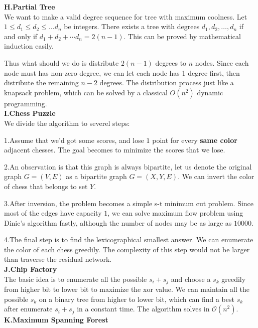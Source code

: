 \documentclass[14pt,a4paper]{article}
\begin{document}
{\Large \bf H.Partial Tree}\\

We want to make a valid degree sequence for tree with maximum coolness.
Let $1 \le d_1 \le d_2 \le \ldots d_n$ be integers.
There exists a tree with degrees $d_1, d_2, \ldots, d_n$ if and only if
$d_1 + d_2 + \cdots d_n = 2(n - 1)$.
This can be proved by mathematical induction easily.

Thus what should we do is distribute $2(n - 1)$ degrees to $n$ nodes.
Since each node must has non-zero degree,
we can let each node has 1 degree first,
then distribute the remaining $n - 2$ degrees.
The distribution process just like a knapsack problem,
which can be solved by a classical $O(n^2)$ dynamic programming.
\\

{\Large \bf I.Chess Puzzle}\\

We divide the algorithm to severel steps:

1.Assume that we'd got some scores, and lose $1$ point for every {\bf same color} adjacent chesses. The goal becomes to minimize the scores that we lose.

2.An observation is that this graph is always bipartite, let us denote the original graph $G=(V,E)$ as a bipartite graph $G=(X,Y,E)$. We can invert the color of chess that belongs to set $Y$.

3.After inversion, the problem becomes a simple s-t minimum cut problem. Since most of the edges have capacity $1$, we can solve maximum flow problem using Dinic's algorithm fastly, although the number of nodes may be as large as $10000$.

4.The final step is to find the lexicographical smallest answer. We can enumerate the color of each chess greedily. The complexity of this step would not be larger than traverse the residual network.
\\

{\Large \bf J.Chip Factory}\\

The basic idea is to enumerate all the possible $s_i + s_j$ and choose a $s_k$ greedily from higher bit to lower bit to maximize the xor value. We can maintain all the possible $s_k$ on a binary tree from higher to lower bit, which can find a best $s_k$ after enumerate $s_i+s_j$ in a constant time. The algorithm solves in $\mathcal{O}(n^2)$.
\\

{\Large \bf K.Maximum Spanning Forest}\\
\end{document}
